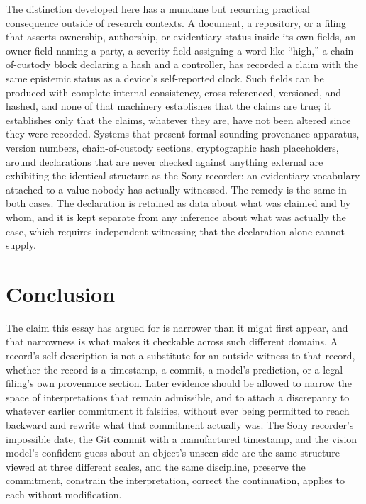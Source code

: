 \documentclass[11pt]{article}
\begin{document}
The distinction developed here has a mundane but recurring practical consequence outside of research contexts. A document, a repository, or a filing that asserts ownership, authorship, or evidentiary status inside its own fields, an owner field naming a party, a severity field assigning a word like ``high,'' a chain-of-custody block declaring a hash and a controller, has recorded a claim with the same epistemic status as a device's self-reported clock. Such fields can be produced with complete internal consistency, cross-referenced, versioned, and hashed, and none of that machinery establishes that the claims are true; it establishes only that the claims, whatever they are, have not been altered since they were recorded. Systems that present formal-sounding provenance apparatus, version numbers, chain-of-custody sections, cryptographic hash placeholders, around declarations that are never checked against anything external are exhibiting the identical structure as the Sony recorder: an evidentiary vocabulary attached to a value nobody has actually witnessed. The remedy is the same in both cases. The declaration is retained as data about what was claimed and by whom, and it is kept separate from any inference about what was actually the case, which requires independent witnessing that the declaration alone cannot supply.

\section{Conclusion}

The claim this essay has argued for is narrower than it might first appear, and that narrowness is what makes it checkable across such different domains. A record's self-description is not a substitute for an outside witness to that record, whether the record is a timestamp, a commit, a model's prediction, or a legal filing's own provenance section. Later evidence should be allowed to narrow the space of interpretations that remain admissible, and to attach a discrepancy to whatever earlier commitment it falsifies, without ever being permitted to reach backward and rewrite what that commitment actually was. The Sony recorder's impossible date, the Git commit with a manufactured timestamp, and the vision model's confident guess about an object's unseen side are the same structure viewed at three different scales, and the same discipline, preserve the commitment, constrain the interpretation, correct the continuation, applies to each without modification.
\end{document}
